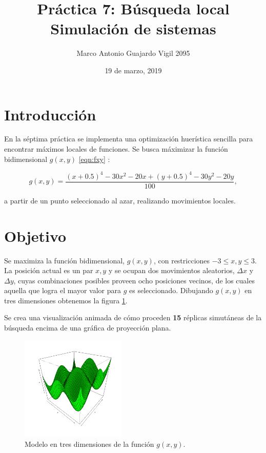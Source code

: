 \documentclass{article}
\author{Marco Antonio Guajardo Vigil  2095}
\title{\textbf{Pr\'actica 7: B\'usqueda local} \\ Simulaci\'on de sistemas}
\date{19 de marzo, 2019}
\begin{document}
\maketitle

\section{Introducci\'on}
En la s\'eptima pr\'actica se implementa una optimizaci\'on huer\'istica sencilla para encontrar m\'aximos locales de funciones.
Se busca m\'aximizar la funci\'on bidimensional $g(x,y)$ \ref{eqn:fxy} :

\begin{equation}
g(x,y) = \frac{(x + 0.5)^4 - 30x^2 - 20x + (y + 0.5)^4 - 30y^2 - 20y}{100}
\label{eqn:fxy},
\end{equation}

a partir de un punto seleccionado al azar, realizando movimientos locales.

\section{Objetivo}

Se maximiza la funci\'on bidimensional, $g(x,y)$, con restricciones $-3 \leq  x,y \leq 3$. La posici\'on actual es un par $x,y$ y se ocupan dos movimientos aleatorios, $\Delta x$ y $\Delta y$, cuyas combinaciones posibles proveen ocho posiciones vecinos, de los cuales aquella que logra el mayor valor para $g$ es seleccionado. Dibujando $g(x,y)$ en tres dimensiones obtenemos la figura \ref{fig:3d}.

Se crea una visualizaci\'on animada de c\'omo proceden \textbf{15} r\'eplicas simut\'aneas de la b\'usqueda encima de una gr\'afica de proyecci\'on plana.

\begin{figure}[h!]
\centering\includegraphics[width=50mm]{3d.png}
\caption{Modelo en tres dimensiones de la funci\'on $g(x,y)$.}
\label{fig:3d}
\end{figure}
\end{document}
